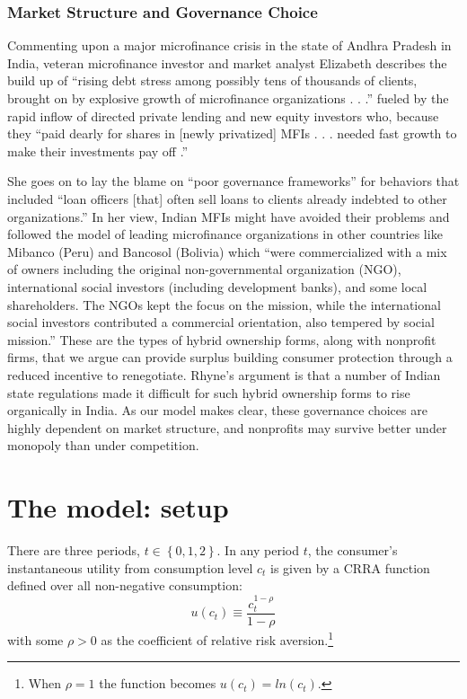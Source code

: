 \documentclass[11pt,english]{article}
\theoremstyle{plain}
\theoremstyle{definition}
\begin{document}
\subsubsection{Market Structure and Governance Choice}

Commenting upon a major microfinance crisis in the state of Andhra
Pradesh in India, veteran microfinance investor and market analyst
Elizabeth \citet{rhyne2011} describes the build up
of ``rising debt stress among possibly tens of thousands of clients,
brought on by explosive growth of microfinance organizations . . .\textquotedblright{}
fueled by the rapid inflow of directed private lending and new equity
investors who, because they ``paid dearly for shares in {[}newly
privatized{]} MFIs . . . needed fast growth to make their investments
pay off .\textquotedblright{}

She goes on to lay the blame on ``poor governance frameworks\textquotedblright{}
for behaviors that included ``loan officers {[}that{]} often sell
loans to clients already indebted to other organizations.'' In her
view, Indian MFIs might have avoided their problems and followed the
model of leading microfinance organizations in other countries like
Mibanco (Peru) and Bancosol (Bolivia) which ``were commercialized
with a mix of owners including the original non-governmental organization
(NGO), international social investors (including development banks),
and some local shareholders. The NGOs kept the focus on the mission,
while the international social investors contributed a commercial
orientation, also tempered by social mission.'' These are the types
of hybrid ownership forms, along with nonprofit firms, that we argue
can provide surplus building consumer protection through a reduced
incentive to renegotiate. Rhyne's argument is that a number of Indian
state regulations made it difficult for such hybrid ownership forms
to rise organically in India. As our model makes clear, these governance
choices are highly dependent on market structure, and nonprofits may
survive better under monopoly than under competition.

\section{The model: setup}

There are three periods, $t\in\left\{ 0,1,2\right\} $. In any period
$t$, the consumer's instantaneous utility from consumption level
$c_{t}$ is given by a CRRA function defined over all non-negative
consumption:
\begin{equation}
u\left(c_{t}\right)\equiv\frac{c_{t}^{1-\rho}}{1-\rho}
\end{equation}
with some $\rho>0$ as the coefficient of relative risk aversion.\footnote{When $\rho=1$ the function becomes $u(c_t)=ln(c_t)$.} 
\end{document}
